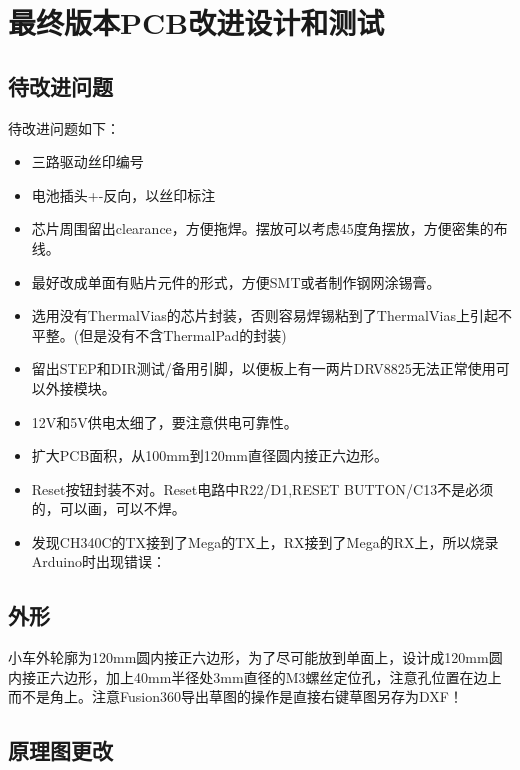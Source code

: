 \chapter{最终版本PCB改进设计和测试}
\label{cha:PCB-v3}

\section{待改进问题}

待改进问题如下：

\begin{itemize}
    \item 三路驱动丝印编号
    \item 电池插头+-反向，以丝印标注
    \item 芯片周围留出clearance，方便拖焊。摆放可以考虑45度角摆放，方便密集的布线。
    \item 最好改成单面有贴片元件的形式，方便SMT或者制作钢网涂锡膏。
    \item 选用没有ThermalVias的芯片封装，否则容易焊锡粘到了ThermalVias上引起不平整。(但是没有不含ThermalPad的封装)
    \item 留出STEP和DIR测试/备用引脚，以便板上有一两片DRV8825无法正常使用可以外接模块。
    \item 12V和5V供电太细了，要注意供电可靠性。
    \item 扩大PCB面积，从100mm到120mm直径圆内接正六边形。
    \item Reset按钮封装不对。Reset电路中R22/D1,RESET BUTTON/C13不是必须的，可以画，可以不焊。
    \item 发现CH340C的TX接到了Mega的TX上，RX接到了Mega的RX上，所以烧录Arduino时出现错误：
\end{itemize}



\section{外形}

小车外轮廓为120mm圆内接正六边形，为了尽可能放到单面上，设计成120mm圆内接正六边形，加上40mm半径处3mm直径的M3螺丝定位孔，注意孔位置在边上而不是角上。注意Fusion360导出草图的操作是直接右键草图另存为DXF！

\section{原理图更改}

